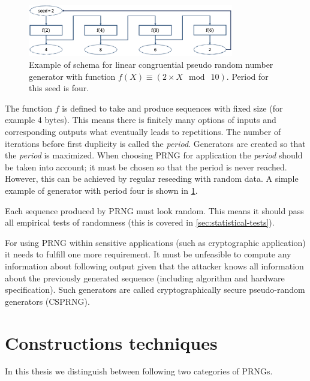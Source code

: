\documentclass[
    digital,    %
    oneside,    %
    color,
    11pt,
    nocover,
    notable,
    nolof,
    nolot,
    final
]{fithesis3}
\renewcommand\_{\textunderscore\allowbreak}
\begin{document}
\begin{figure}[h]
	\centering
	\includegraphics[width=0.8\textwidth]{./images/pictures/prng.png}
	\caption{Example of schema for linear congruential pseudo random number generator with function $f(X) \equiv \left(2 \times X~\bmod~10 \right)$. Period for this seed is four.}
	\label{fig:prng}
\end{figure}

The function $f$ is defined to take and produce sequences with fixed size (for example 4 bytes). This means there is finitely many options of inputs and corresponding outputs what eventually leads to repetitions. The number of iterations before first duplicity is called the \textit{period}. Generators are created so that the \textit{period} is maximized. When choosing PRNG for application the \textit{period} should be taken into account; it must be chosen so that the period is never reached. However, this can be achieved by regular reseeding with random data. A simple example of generator with period four is shown in \cref{fig:prng}.

Each sequence produced by PRNG must look random. This means it should pass all empirical tests of randomness (this is covered in \cref{sec:statistical-tests}). \cite{schneier1996applied}

For using PRNG within sensitive applications (such as cryptographic application) it needs to fulfill one more requirement. It must be unfeasible to compute any information about following output given that the attacker knows all information about the previously generated sequence (including algorithm and hardware specification). Such generators are called cryptographically secure pseudo-random generators (CSPRNG). \cite{schneier1996applied}

\section{Constructions techniques}

In this thesis we distinguish between following two categories of PRNGs.
\end{document}
